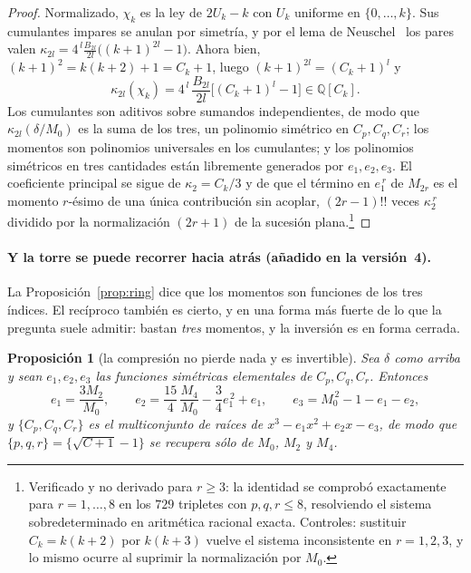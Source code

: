 \documentclass[11pt,a4paper]{article}
\newtheorem{proposicion}{Proposici\'on}
\begin{document}
\begin{proof}
Normalizado, $\chi_k$ es la ley de $2U_k-k$ con $U_k$ uniforme en $\{0,\dots,k\}$. Sus
cumulantes impares se anulan por simetr\'ia, y por el lema de
Neuschel~\cite[Lema~2.1]{Neuschel} los pares valen
$\kappa_{2l}=4^{\,l}\frac{B_{2l}}{2l}\big((k+1)^{2l}-1\big)$. Ahora bien,
$(k+1)^2=k(k+2)+1=C_k+1$, luego $(k+1)^{2l}=(C_k+1)^l$ y
\[
\kappa_{2l}(\chi_k)=4^{\,l}\,\frac{B_{2l}}{2l}\Big[(C_k+1)^l-1\Big]\in\mathbb{Q}[C_k].
\]
Los cumulantes son aditivos sobre sumandos independientes, de modo que
$\kappa_{2l}(\delta/M_0)$ es la suma de los tres, un polinomio sim\'etrico en $C_p,C_q,C_r$;
los momentos son polinomios universales en los cumulantes; y los polinomios sim\'etricos en
tres cantidades est\'an libremente generados por $e_1,e_2,e_3$. El coeficiente principal se
sigue de $\kappa_2=C_k/3$ y de que el t\'ermino en $e_1^{\,r}$ de $M_{2r}$ es el momento
$r$-\'esimo de una \'unica contribuci\'on sin acoplar, $(2r-1)!!$ veces $\kappa_2^{\,r}$
dividido por la normalizaci\'on $(2r+1)$ de la sucesi\'on plana.\footnote{Verificado y no
derivado para $r\ge3$: la identidad se comprob\'o exactamente para $r=1,\dots,8$ en los $729$
tripletes con $p,q,r\le8$, resolviendo el sistema sobredeterminado en aritm\'etica racional
exacta. Controles: sustituir $C_k=k(k+2)$ por $k(k+3)$ vuelve el sistema inconsistente en
$r=1,2,3$, y lo mismo ocurre al suprimir la normalizaci\'on por $M_0$.}
\end{proof}

\paragraph{Y la torre se puede recorrer hacia atr\'as (a\~nadido en la versi\'on~4).} La
Proposici\'on~\ref{prop:ring} dice que los momentos son funciones de los tres \'indices. El
rec\'iproco tambi\'en es cierto, y en una forma m\'as fuerte de lo que la pregunta suele admitir:
bastan \emph{tres} momentos, y la inversi\'on es en forma cerrada.

\begin{proposicion}[la compresi\'on no pierde nada y es invertible]\label{prop:inverse}
Sea $\delta$ como arriba y sean $e_1,e_2,e_3$ las funciones sim\'etricas elementales de
$C_p,C_q,C_r$. Entonces
\begin{equation}\label{eq:inverse}
\boxed{\;
e_1=\frac{3M_2}{M_0},\qquad
e_2=\frac{15}{4}\,\frac{M_4}{M_0}-\frac34 e_1^{\,2}+e_1,\qquad
e_3=M_0^{\,2}-1-e_1-e_2,\;}
\end{equation}
y $\{C_p,C_q,C_r\}$ es el multiconjunto de ra\'ices de $x^3-e_1x^2+e_2x-e_3$, de modo que
$\{p,q,r\}=\{\sqrt{C+1}-1\}$ se recupera s\'olo de $M_0$, $M_2$ y $M_4$.
\end{proposicion}
\end{document}
